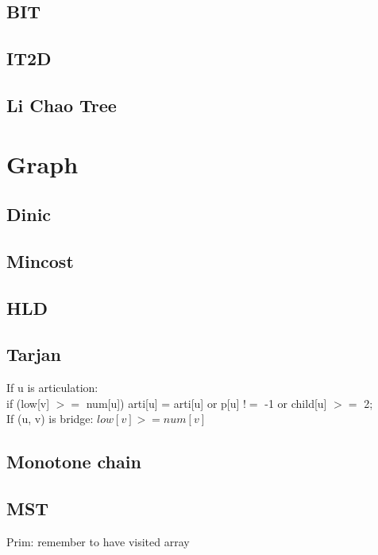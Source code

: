 \documentclass[A4 paper, 12pt, oneside, landscape]{article}
\begin{document}
\begin{multicols}{2}
	\subsection{BIT}
	
	
	\subsection{IT2D}
	
	
	\subsection{Li Chao Tree}
	

\section{Graph}
	\subsection{Dinic}
	

	\subsection{Mincost}
	
	
	\subsection{HLD}
	
	
	\subsection{Tarjan}
If u is articulation: \\
if (low[v] $>=$ num[u]) arti[u] = arti[u] or p[u] $!=$ -1 or child[u] $>=$ 2; \\
If (u, v) is bridge: $low[v] >= num[v]$
	\subsection{Monotone chain}
	

	\subsection{MST}
	Prim: remember to have visited array
	

\end{multicols}
\end{document}
